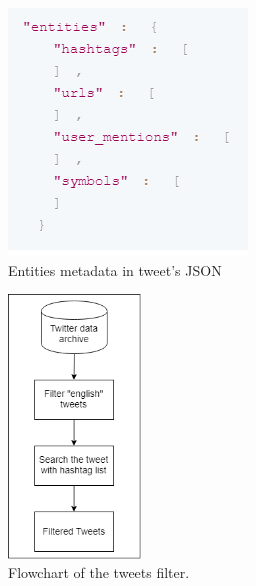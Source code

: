 \begin{figure}
	\centering
	\includegraphics[width=0.5\linewidth]{images/entities.png}
	\caption{Entities metadata in tweet's JSON}
	\label{fig:entities}
\end{figure}

\begin{figure}
	\centering
	\includegraphics[width=5cm\linewidth,height=7cm]{images/filtertweets.png}
	\caption{Flowchart of the tweets filter.}
	\label{fig:tweetsfilter}
\end{figure}


